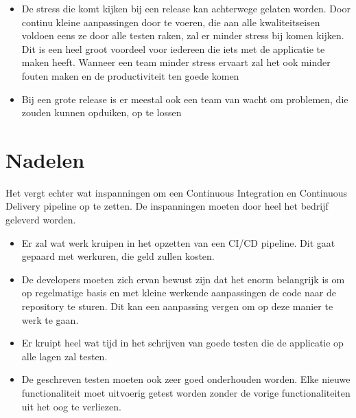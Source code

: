 \begin{itemize}
    \item De stress die komt kijken bij een release kan achterwege gelaten worden. Door continu kleine aanpassingen door te voeren, die aan alle kwaliteitseisen voldoen eens ze door alle testen raken, zal er minder stress bij komen kijken. Dit is een heel groot voordeel voor iedereen die iets met de applicatie te maken heeft. Wanneer een team minder stress ervaart zal het ook minder fouten maken en de productiviteit ten goede komen
    \item Bij een grote release is er meestal ook een team van wacht om problemen, die zouden kunnen opduiken, op te lossen
\end{itemize}

\section{Nadelen}
Het vergt echter wat inspanningen om een Continuous Integration en Continuous Delivery pipeline op te zetten. De inspanningen moeten door heel het bedrijf geleverd worden.
\begin{itemize}
    \item Er zal wat werk kruipen in het opzetten van een CI/CD pipeline. Dit gaat gepaard met werkuren, die geld zullen kosten.
    \item De developers moeten zich ervan bewust zijn dat het enorm belangrijk is om op regelmatige basis en met kleine werkende aanpassingen de code naar de repository te sturen. Dit kan een aanpassing vergen om op deze manier te werk te gaan.
    \item Er kruipt heel wat tijd in het schrijven van goede testen die de applicatie op alle lagen zal testen.
    \item De geschreven testen moeten ook zeer goed onderhouden worden. Elke nieuwe functionaliteit moet uitvoerig getest worden zonder de vorige functionaliteiten uit het oog te verliezen.
\end{itemize}